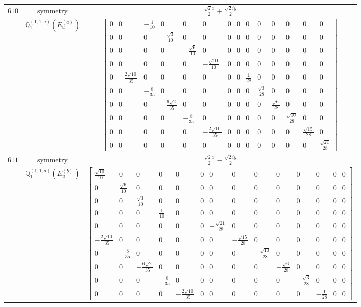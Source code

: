 \documentclass[fleqn,8pt,landscape]{jsarticle}
\begin{document}
\begin{longtable}{ccc}
$ 610 $ & $ \text{symmetry} $ & $ \frac{\sqrt{2} x}{2} + \frac{\sqrt{2} i y}{2} $ \\
$  $ & $ \mathbb{Q}_{1}^{(1,1;a)}(E_{u}^{(a)}) $ & $ \begin{bmatrix} 0 & 0 & - \frac{1}{10} & 0 & 0 & 0 & 0 & 0 & 0 & 0 & 0 & 0 & 0 & 0 \\ 0 & 0 & 0 & - \frac{\sqrt{3}}{10} & 0 & 0 & 0 & 0 & 0 & 0 & 0 & 0 & 0 & 0 \\ 0 & 0 & 0 & 0 & - \frac{\sqrt{6}}{10} & 0 & 0 & 0 & 0 & 0 & 0 & 0 & 0 & 0 \\ 0 & 0 & 0 & 0 & 0 & - \frac{\sqrt{10}}{10} & 0 & 0 & 0 & 0 & 0 & 0 & 0 & 0 \\ 0 & - \frac{2 \sqrt{10}}{35} & 0 & 0 & 0 & 0 & 0 & 0 & \frac{1}{28} & 0 & 0 & 0 & 0 & 0 \\ 0 & 0 & - \frac{8}{35} & 0 & 0 & 0 & 0 & 0 & 0 & \frac{\sqrt{3}}{28} & 0 & 0 & 0 & 0 \\ 0 & 0 & 0 & - \frac{6 \sqrt{2}}{35} & 0 & 0 & 0 & 0 & 0 & 0 & \frac{\sqrt{6}}{28} & 0 & 0 & 0 \\ 0 & 0 & 0 & 0 & - \frac{8}{35} & 0 & 0 & 0 & 0 & 0 & 0 & \frac{\sqrt{10}}{28} & 0 & 0 \\ 0 & 0 & 0 & 0 & 0 & - \frac{2 \sqrt{10}}{35} & 0 & 0 & 0 & 0 & 0 & 0 & \frac{\sqrt{15}}{28} & 0 \\ 0 & 0 & 0 & 0 & 0 & 0 & 0 & 0 & 0 & 0 & 0 & 0 & 0 & \frac{\sqrt{21}}{28} \end{bmatrix} $ \\ \hline
$ 611 $ & $ \text{symmetry} $ & $ \frac{\sqrt{2} x}{2} - \frac{\sqrt{2} i y}{2} $ \\
$  $ & $ \mathbb{Q}_{1}^{(1,1;a)}(E_{u}^{(b)}) $ & $ \begin{bmatrix} \frac{\sqrt{10}}{10} & 0 & 0 & 0 & 0 & 0 & 0 & 0 & 0 & 0 & 0 & 0 & 0 & 0 \\ 0 & \frac{\sqrt{6}}{10} & 0 & 0 & 0 & 0 & 0 & 0 & 0 & 0 & 0 & 0 & 0 & 0 \\ 0 & 0 & \frac{\sqrt{3}}{10} & 0 & 0 & 0 & 0 & 0 & 0 & 0 & 0 & 0 & 0 & 0 \\ 0 & 0 & 0 & \frac{1}{10} & 0 & 0 & 0 & 0 & 0 & 0 & 0 & 0 & 0 & 0 \\ 0 & 0 & 0 & 0 & 0 & 0 & - \frac{\sqrt{21}}{28} & 0 & 0 & 0 & 0 & 0 & 0 & 0 \\ - \frac{2 \sqrt{10}}{35} & 0 & 0 & 0 & 0 & 0 & 0 & - \frac{\sqrt{15}}{28} & 0 & 0 & 0 & 0 & 0 & 0 \\ 0 & - \frac{8}{35} & 0 & 0 & 0 & 0 & 0 & 0 & - \frac{\sqrt{10}}{28} & 0 & 0 & 0 & 0 & 0 \\ 0 & 0 & - \frac{6 \sqrt{2}}{35} & 0 & 0 & 0 & 0 & 0 & 0 & - \frac{\sqrt{6}}{28} & 0 & 0 & 0 & 0 \\ 0 & 0 & 0 & - \frac{8}{35} & 0 & 0 & 0 & 0 & 0 & 0 & - \frac{\sqrt{3}}{28} & 0 & 0 & 0 \\ 0 & 0 & 0 & 0 & - \frac{2 \sqrt{10}}{35} & 0 & 0 & 0 & 0 & 0 & 0 & - \frac{1}{28} & 0 & 0 \end{bmatrix} $ \\ \hline

\end{longtable}
\end{document}
